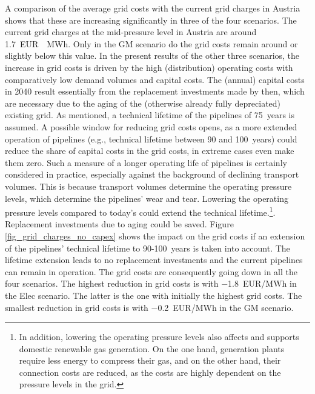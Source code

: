 A comparison of the average grid costs with the current grid charges in Austria shows that these are increasing significantly in three of the four scenarios. The current grid charges at the mid-pressure level in Austria are around \SI{1.7}{EUR \per MWh}. Only in the GM scenario do the grid costs remain around or slightly below this value. In the present results of the other three scenarios, the increase in grid costs is driven by the high (distribution) operating costs with comparatively low demand volumes and capital costs. The (annual) capital costs in 2040 result essentially from the replacement investments made by then, which are necessary due to the aging of the (otherwise already fully depreciated) existing grid. As mentioned, a technical lifetime of the pipelines of \SI{75}{years} is assumed. A possible window for reducing grid costs opens, as a more extended operation of pipelines (e.g., technical lifetime between 90 and \SI{100}{years}) could reduce the share of capital costs in the grid costs, in extreme cases even make them zero. Such a measure of a longer operating life of pipelines is certainly considered in practice, especially against the background of declining transport volumes. This is because transport volumes determine the operating pressure levels, which determine the pipelines' wear and tear. Lowering the operating pressure levels compared to today's could extend the technical lifetime.\footnote{In addition, lowering the operating pressure levels also affects and supports domestic renewable gas generation. On the one hand, generation plants require less energy to compress their gas, and on the other hand, their connection costs are reduced, as the costs are highly dependent on the pressure levels in the grid.}. Replacement investments due to aging could be saved. Figure \ref{fig_grid_charges_no_capex} shows the impact on the grid costs if an extension of the pipelines' technical lifetime to \SI{90}{}-\SI{100}{years} is taken into account. The lifetime extension leads to no replacement investments and the current pipelines can remain in operation. The grid costs are consequently going down in all the four scenarios. The highest reduction in grid costs is with \SI{-1.8}{EUR/MWh} in the Elec scenario. The latter is the one with initially the highest grid costs. The smallest reduction in grid costs is with \SI{-0.2}{EUR/MWh} in the GM scenario.

